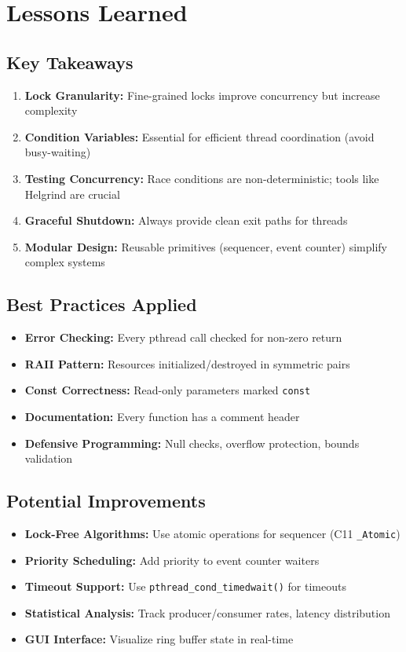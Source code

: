 \documentclass[12pt,a4paper]{article}
\begin{document}
\clearpage

\section{Lessons Learned}

\subsection{Key Takeaways}
\begin{enumerate}[leftmargin=*]
    \item \textbf{Lock Granularity:} Fine-grained locks improve concurrency but increase complexity
    \item \textbf{Condition Variables:} Essential for efficient thread coordination (avoid busy-waiting)
    \item \textbf{Testing Concurrency:} Race conditions are non-deterministic; tools like Helgrind are crucial
    \item \textbf{Graceful Shutdown:} Always provide clean exit paths for threads
    \item \textbf{Modular Design:} Reusable primitives (sequencer, event counter) simplify complex systems
\end{enumerate}

\subsection{Best Practices Applied}
\begin{itemize}[leftmargin=*]
    \item \textbf{Error Checking:} Every pthread call checked for non-zero return
    \item \textbf{RAII Pattern:} Resources initialized/destroyed in symmetric pairs
    \item \textbf{Const Correctness:} Read-only parameters marked \texttt{const}
    \item \textbf{Documentation:} Every function has a comment header
    \item \textbf{Defensive Programming:} Null checks, overflow protection, bounds validation
\end{itemize}

\subsection{Potential Improvements}
\begin{itemize}[leftmargin=*]
    \item \textbf{Lock-Free Algorithms:} Use atomic operations for sequencer (C11 \texttt{\_Atomic})
    \item \textbf{Priority Scheduling:} Add priority to event counter waiters
    \item \textbf{Timeout Support:} Use \texttt{pthread\_cond\_timedwait()} for timeouts
    \item \textbf{Statistical Analysis:} Track producer/consumer rates, latency distribution
    \item \textbf{GUI Interface:} Visualize ring buffer state in real-time
\end{itemize}
\end{document}
